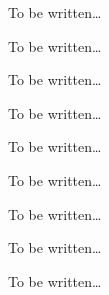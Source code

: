 \begin{command}{\pgfsys@animation@paced{}}
  To be written\dots
\end{command}

\begin{command}{\pgfsys@animation@spline{}}
  To be written\dots
\end{command}



\begin{command}{\pgfsys@animation@text{}}
  To be written\dots
\end{command}

\begin{command}{\pgfsys@animation@scalar{}}
  To be written\dots
\end{command}

\begin{command}{\pgfsys@animation@dimension{}}
  To be written\dots
\end{command}

\begin{command}{\pgfsys@animation@color@rgb{}}
  To be written\dots
\end{command}

\begin{command}{\pgfsys@animation@color@cmyk{}}
  To be written\dots
\end{command}

\begin{command}{\pgfsys@animation@color@cmy{}}
  To be written\dots
\end{command}

\begin{command}{\pgfsys@animation@color@gray{}}
  To be written\dots
\end{command}

